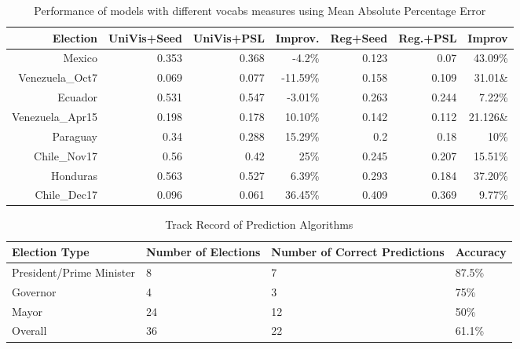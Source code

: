 \begin{table}[Ht]
	\centering
	\begin{tabular}{| r || r | r | r | r | r | r |}
 	\hline
 	Election & UniVis+Seed & UniVis+PSL & Improv. & Reg+Seed & Reg.+PSL & Improv\\
 	\hline
	Mexico & 0.353 & 0.368 & -4.2\% & 0.123 & 0.07 & 43.09\% \\ 	
 	Venezuela\_Oct7 & 0.069	& 0.077 & -11.59\% & 0.158 & 0.109 & 31.01\&\\
	Ecuador & 0.531 & 0.547 & -3.01\% & 0.263 & 0.244 & 7.22\% \\
	Venezuela\_Apr15 & 0.198 & 0.178 & 10.10\% & 0.142 & 0.112 & 21.126\&\\
	Paraguay & 0.34 & 0.288 & 15.29\% & 0.2 & 0.18 & 10\% \\
	Chile\_Nov17 & 0.56 & 0.42 & 25\% & 0.245 & 0.207 & 15.51\% \\
	Honduras & 0.563 & 0.527 & 6.39\% & 0.293 & 0.184 & 37.20\% \\
	Chile\_Dec17 & 0.096 & 0.061 & 36.45\% & 0.409 & 0.369 & 9.77\% \\
 	\hline
	\end{tabular}
	\vspace{-0.5em}
	\caption{Performance of models with different vocabs measures using Mean Absolute Percentage Error}
	\label{table:improvement}
	\vspace{-0.5em}
\end{table}	

\begin{table}[Ht]
	\centering
	\begin{tabular}{| l | l | l | l |}
	\hline
	Election Type & Number of Elections & Number of Correct Predictions & Accuracy\\
	\hline
	President/Prime Minister & 8 & 7 & 87.5\%\\
	Governor & 4 & 3 & 75\%\\
	Mayor & 24 & 12 & 50\%\\
	Overall & 36 & 22 & 61.1\%\\
	\hline
	\end{tabular}
	\vspace{-0.5em}
	\caption{Track Record of Prediction Algorithms}
	\label{table:trackRecord}
	\vspace{-0.5em}
\end{table}

